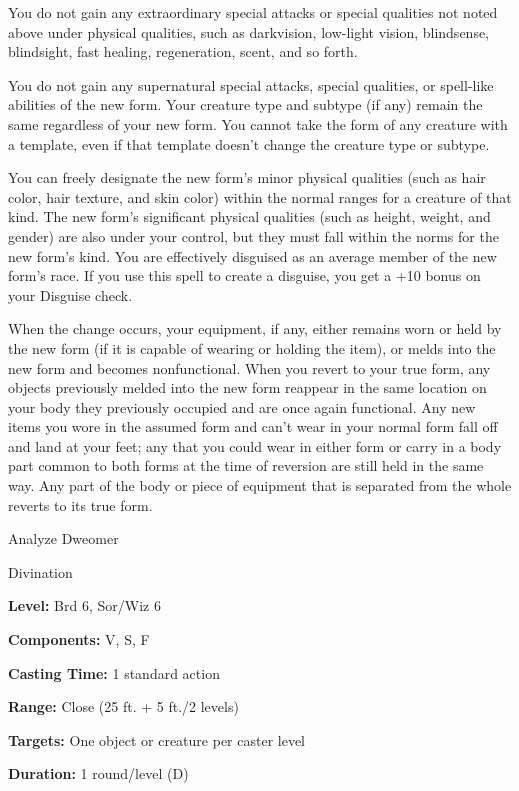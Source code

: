 \documentclass{article}
\begin{document}
You do not gain any extraordinary special attacks or special qualities not noted 
above under physical qualities, such as darkvision, low-light vision, blindsense, 
blindsight, fast healing, regeneration, scent, and so forth.

You do not gain any supernatural special attacks, special qualities, or spell-like 
abilities of the new form. Your creature type and subtype (if any) remain the same 
regardless of your new form. You cannot take the form of any creature with a template, 
even if that template doesn't change the creature type or subtype.

You can freely designate the new form's minor physical qualities (such as hair 
color, hair texture, and skin color) within the normal ranges for a creature of 
that kind. The new form's significant physical qualities (such as height, weight, 
and gender) are also under your control, but they must fall within the norms for 
the new form's kind. You are effectively disguised as an average member of the 
new form's race. If you use this spell to create a disguise, you get a +10 bonus 
on your Disguise check.

When the change occurs, your equipment, if any, either remains worn or held by 
the new form (if it is capable of wearing or holding the item), or melds into the 
new form and becomes nonfunctional. When you revert to your true form, any objects 
previously melded into the new form reappear in the same location on your body 
they previously occupied and are once again functional. Any new items you wore 
in the assumed form and can't wear in your normal form fall off and land at your 
feet; any that you could wear in either form or carry in a body part common to 
both forms at the time of reversion are still held in the same way. Any part of 
the body or piece of equipment that is separated from the whole reverts to its 
true form.

\vspace{12pt}
Analyze Dweomer

Divination

\textbf{Level:} Brd 6, Sor/Wiz 6

\textbf{Components:} V, S, F

\textbf{Casting Time:} 1 standard action

\textbf{Range:} Close (25 ft. + 5 ft./2 levels)

\textbf{Targets:} One object or creature per caster level

\textbf{Duration:} 1 round/level (D)
\end{document}
